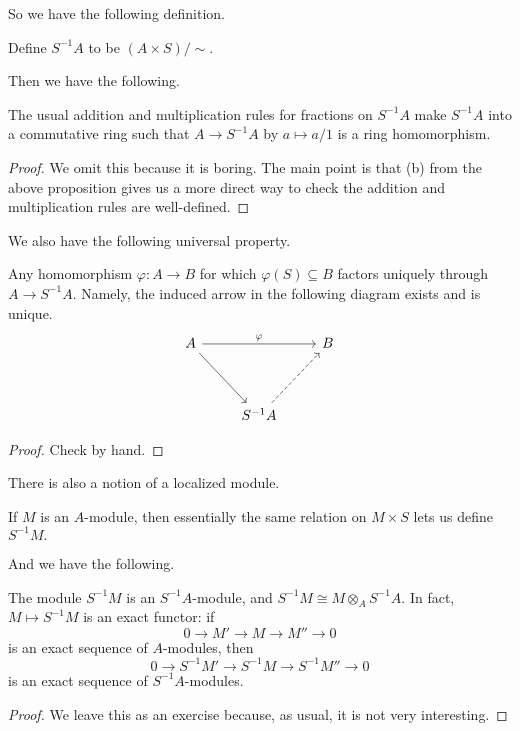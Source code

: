 \documentclass[../notes.tex]{subfiles}
\begin{document}
So we have the following definition.
\begin{definition}
    Define $S^{-1}A$ to be $(A\times S)/\sim.$
\end{definition}
Then we have the following.
\begin{proposition}
    The usual addition and multiplication rules for fractions on $S^{-1}A$ make $S^{-1}A$ into a commutative ring such that $A\to S^{-1}A$ by $a\mapsto a/1$ is a ring homomorphism.
\end{proposition}
\begin{proof}
    We omit this because it is boring. The main point is that (b) from the above proposition gives us a more direct way to check the addition and multiplication rules are well-defined.
\end{proof}
We also have the following universal property.
\begin{proposition}
    Any homomorphism $\varphi:A\to B$ for which $\varphi(S)\subseteq B$ factors uniquely through $A\to S^{-1}A.$ Namely, the induced arrow in the following diagram exists and is unique.
    \[\begin{tikzcd}
        A && B \\
        \\
        & {S^{-1}A}
        \arrow["\varphi", from=1-1, to=1-3]
        \arrow[from=1-1, to=3-2]
        \arrow[dashed, from=3-2, to=1-3]
    \end{tikzcd}\]
\end{proposition}
\begin{proof}
    Check by hand.
\end{proof}
There is also a notion of a localized module.
\begin{definition}
    If $M$ is an $A$-module, then essentially the same relation on $M\times S$ lets us define $S^{-1}M.$
\end{definition}
And we have the following.
\begin{proposition}
    The module $S^{-1}M$ is an $S^{-1}A$-module, and $S^{-1}M\cong M\otimes_AS^{-1}A.$ In fact, $M\mapsto S^{-1}M$ is an exact functor: if
    \[0\to M'\to M\to M''\to 0\]
    is an exact sequence of $A$-modules, then
    \[0\to S^{-1}M'\to S^{-1}M\to S^{-1}M''\to0\]
    is an exact sequence of $S^{-1}A$-modules.
\end{proposition}
\begin{proof}
    We leave this as an exercise because, as usual, it is not very interesting.
\end{proof}
\end{document}
